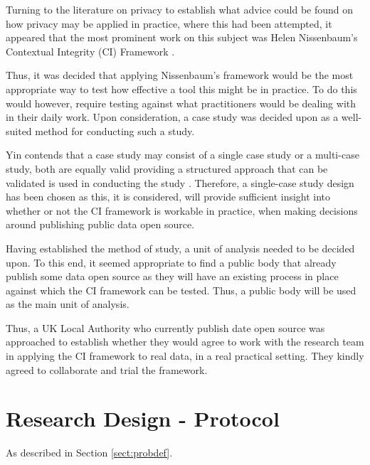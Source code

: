 Turning to the literature on privacy to establish what advice could be found on how privacy may be applied in practice, where this had been attempted, it appeared that the most prominent work on this subject was Helen Nissenbaum's Contextual Integrity (CI) Framework \citep{Nissenbaum_2010}.  %

Thus, it was decided that applying Nissenbaum's framework would be the most appropriate way to test how effective a tool this might be in practice. To do this would however, require testing against what practitioners would be dealing with in their daily work. Upon consideration, a case study was decided upon as a well-suited method for conducting such a study. 

Yin contends that a case study may consist of a single case study or a multi-case study, both are equally valid providing a structured approach that can be validated is used in conducting the study \citep{Yin_Case_studies_and_org_in_1985}. Therefore, a single-case study design has been chosen as this, it is considered, will provide sufficient insight into whether or not the CI framework is workable in practice, when making decisions around publishing public data open source.

Having established the method of study, a unit of analysis needed to be decided upon. To this end, it seemed appropriate to find a public body that already publish some data open source as they will have an existing process in place against which the CI framework can be tested. Thus, a public body will be used as the main unit of analysis. 

Thus, a UK Local Authority who currently publish date open source was approached to establish whether they would agree to work with the research team in applying the CI framework to real data, in a real practical setting. They kindly agreed to collaborate and trial the framework.  %

\section {Research Design - Protocol}
As described in Section \ref{sect:probdef}.


